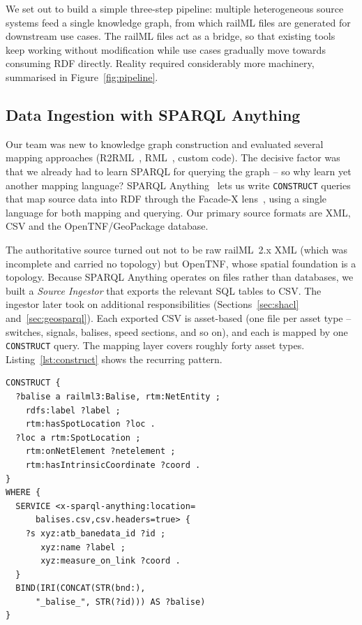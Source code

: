 \documentclass[twocolumn]{ceurart}
\begin{document}
We set out to build a simple three-step pipeline: multiple heterogeneous source
systems feed a single knowledge graph, from which railML files are generated for
downstream use cases. The railML files act as a bridge, so that existing tools
keep working without modification while use cases gradually move towards
consuming RDF directly. Reality required considerably more machinery, summarised
in Figure~\ref{fig:pipeline}.

\subsection{Data Ingestion with SPARQL Anything}

Our team was new to knowledge graph construction and evaluated several mapping
approaches (R2RML~\cite{r2rml}, RML~\cite{rml}, custom code). The decisive factor
was that we already had to learn SPARQL for querying the graph -- so why learn
yet another mapping language? SPARQL Anything~\cite{sparqlanything} lets us write
\texttt{CONSTRUCT} queries that map source data into RDF through the Facade-X
lens~\cite{facadex}, using a single language for both mapping and querying. Our
primary source formats are XML, CSV and the OpenTNF/GeoPackage database.

The authoritative source turned out not to be raw railML~2.x XML (which was
incomplete and carried no topology) but OpenTNF, whose spatial foundation is a
topology. Because SPARQL Anything operates on files rather than databases, we
built a \emph{Source Ingestor} that exports the relevant SQL tables to CSV. The
ingestor later took on additional responsibilities (Sections~\ref{sec:shacl}
and~\ref{sec:geosparql}). Each exported CSV is asset-based (one file per asset
type -- switches, signals, balises, speed sections, and so on), and each is
mapped by one \texttt{CONSTRUCT} query. The mapping layer covers roughly forty
asset types. Listing~\ref{lst:construct} shows the recurring pattern.

\begin{lstlisting}[language=sparql,caption={Asset mapping with SPARQL Anything: a
  \texttt{SERVICE} clause reads a CSV through Facade-X; the \texttt{CONSTRUCT}
  builds railML/RTM triples and positions the asset by intrinsic
  coordinate.},label={lst:construct}]
CONSTRUCT {
  ?balise a railml3:Balise, rtm:NetEntity ;
    rdfs:label ?label ;
    rtm:hasSpotLocation ?loc .
  ?loc a rtm:SpotLocation ;
    rtm:onNetElement ?netelement ;
    rtm:hasIntrinsicCoordinate ?coord .
}
WHERE {
  SERVICE <x-sparql-anything:location=
      balises.csv,csv.headers=true> {
    ?s xyz:atb_banedata_id ?id ;
       xyz:name ?label ;
       xyz:measure_on_link ?coord .
  }
  BIND(IRI(CONCAT(STR(bnd:),
      "_balise_", STR(?id))) AS ?balise)
}
\end{lstlisting}
\end{document}
